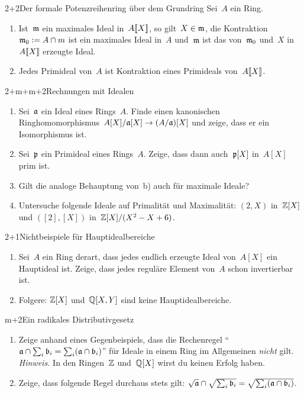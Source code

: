 \documentclass[entwurf]{uebblatt}
\begin{document}

\begin{aufgabe}{2+2}{Der formale Potenzreihenring über dem Grundring}
Sei~$A$ ein Ring.
\begin{enumerate}
\item Ist~$\mathfrak{m}$ ein maximales Ideal in~${A}\llbracket{X}\rrbracket$, so gilt~$X \in \mathfrak{m}$, die
Kontraktion~$\mathfrak{m}_0 \vcentcolon= A \cap m$ ist ein maximales Ideal in~$A$ und~$\mathfrak{m}$
ist das von~$\mathfrak{m}_0$ und~$X$ in~${A}\llbracket{X}\rrbracket$ erzeugte Ideal.
\item Jedes Primideal von~$A$ ist Kontraktion eines Primideals von~${A}\llbracket{X}\rrbracket$.
\end{enumerate}
\end{aufgabe}

\begin{aufgabe}{2+m+m+2}{Rechnungen mit Idealen}
\begin{enumerate}
\item Sei~$\mathfrak{a}$ ein Ideal eines Rings~$A$. Finde einen kanonischen
Ringhomomorphismus~$A[X]/\mathfrak{a}[X] \to (A/\mathfrak{a})[X]$ und zeige, dass er ein
Isomorphismus ist.
\item Sei~$\mathfrak{p}$ ein Primideal eines Rings~$A$. Zeige, dass dann auch~$\mathfrak{p}[X]$
in~$A[X]$ prim ist.
\item Gilt die analoge Behauptung von~b) auch für maximale Ideale?
\item Untersuche folgende Ideale auf Primalität und Maximalität:
$(2, X)$ in~$\mathbb{Z}[X]$ und $([2], [X])$ in~$\mathbb{Z}[X]/(X^2 - X + 6)$.
\end{enumerate}
\end{aufgabe}

\begin{aufgabe}{2+1}{Nichtbeispiele für Hauptidealbereiche}
\begin{enumerate}
\item Sei~$A$ ein Ring derart, dass jedes endlich erzeugte Ideal von~$A[X]$ ein
Hauptideal ist. Zeige, dass jedes reguläre Element von~$A$ schon invertierbar
ist.
\item Folgere: $\mathbb{Z}[X]$ und~$\mathbb{Q}[X,Y]$ sind keine Hauptidealbereiche.
\end{enumerate}
\end{aufgabe}

\begin{aufgabe}{m+2}{Ein radikales Distributivgesetz}
\begin{enumerate}
\item Zeige anhand eines Gegenbeispiels, dass die Rechenregel
"`$\mathfrak{a} \cap \sum_i \mathfrak{b}_i = \sum_i (\mathfrak{a} \cap \mathfrak{b}_i)$"'
für Ideale in
einem Ring im Allgemeinen \emph{nicht} gilt. \emph{Hinweis.} In den
Ringen~$\mathbb{Z}$ und~$\mathbb{Q}[X]$ wirst du keinen Erfolg haben.
\item Zeige, dass folgende Regel durchaus stets gilt:
$\sqrt{\mathfrak{a}} \cap \sqrt{\sum_i \mathfrak{b}_i} = \sqrt{\sum_i (\mathfrak{a} \cap \mathfrak{b}_i)}$.
\end{enumerate}
\end{aufgabe}
\end{document}
